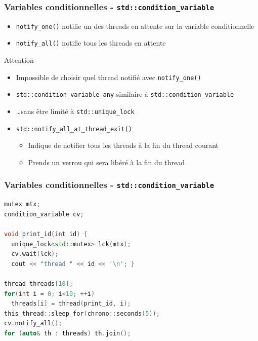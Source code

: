 \documentclass[C++.tex]{subfiles}
\begin{document}
\begin{frame}[fragile]
	\frametitle{Variables conditionnelles - \lstinline|std::condition_variable|}
	\begin{itemize}
		\item \lstinline|notify_one()| notifie un des threads en attente sur la variable conditionnelle
		\item \lstinline|notify_all()| notifie tous les threads en attente
	\end{itemize}

	\begin{alertblock}{Attention}
		\begin{itemize}
			\item Impossible de choisir quel thread notifié avec \lstinline|notify_one()|
		\end{itemize}
	\end{alertblock}

	\begin{itemize}
		\item \lstinline|std::condition_variable_any| similaire à \lstinline|std::condition_variable|
		\item \ldots{}sans être limité à \lstinline|std::unique_lock|
		\item \lstinline|std::notify_all_at_thread_exit()| 
		\begin{itemize}
			\item Indique de notifier tous les threads à la fin du thread courant
			\item Prends un verrou qui sera libéré à la fin du thread
		\end{itemize}
	\end{itemize}
\end{frame}

\begin{frame}[fragile]
	\frametitle{Variables conditionnelles - \lstinline|std::condition_variable|}
	\begin{lstlisting}[language=C++]
mutex mtx;
condition_variable cv;

void print_id(int id) {
  unique_lock<std::mutex> lck(mtx);
  cv.wait(lck);
  cout << "thread " << id << '\n'; }

thread threads[10];
for(int i = 0; i<10; ++i)
  threads[i] = thread(print_id, i);
this_thread::sleep_for(chrono::seconds(5));
cv.notify_all();
for (auto& th : threads) th.join();\end{lstlisting}
\end{frame}
\end{document}
